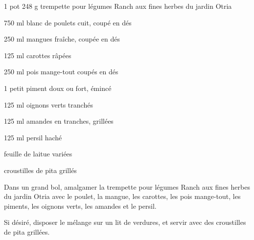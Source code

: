 

\totaltime{}


\begin{ingredients}
    \item 1 pot 248 g trempette pour légumes Ranch aux fines herbes du jardin Otria
    \item 750 ml blanc de poulets cuit, coupé en dés
    \item 250 ml mangues fraîche, coupée en dés
    \item 125 ml carottes râpées
    \item 250 ml pois mange-tout coupés en dés
    \item 1 petit piment doux ou fort, émincé
    \item 125 ml oignons verts tranchés
    \item 125 ml amandes en tranches, grillées
    \item 125 ml persil haché
    \item feuille de laitue variées
    \item croustilles de pita grillés
\end{ingredients}

\begin{steps}
    \item Dans un grand bol, amalgamer la trempette pour légumes Ranch aux fines herbes du jardin Otria avec le poulet, la mangue, les carottes, les pois mange-tout, les piments, les oignons verts, les amandes et le persil.
    \item Si désiré, disposer le mélange sur un lit de verdures, et servir avec des croustilles de pita grillées.
\end{steps}
